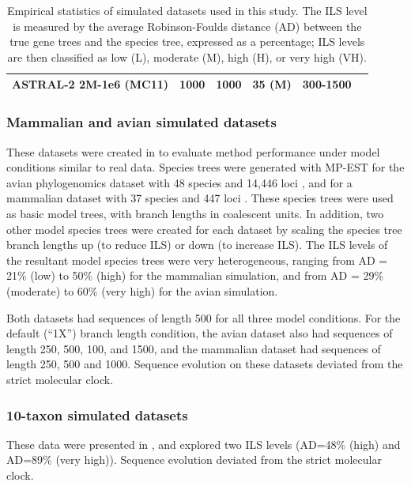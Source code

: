 \begin{table}
\begin{tabular}{| c | c | c | c | c | c|}
    ASTRAL-2 2M-1e6 (MC11) & 1000 & 1000 & 35 (M) & 300-1500& \cite{ASTRALII}\\ 
    \hline
  \end{tabular}
\caption[Empirical statistics of simulated datasets used in ASTRID
    study.]{Empirical statistics of simulated datasets used in this
    study. {\rm The ILS level 
is measured by the average Robinson-Foulds distance (AD) between the true
  gene trees and the species tree, expressed as a percentage; ILS levels
are then classified as low (L), moderate (M), high (H), or very high (VH).
}
} 
\label{astrid::table:datasets}
\end{table}

\subsubsection{Mammalian and avian simulated datasets}

These datasets were created  in \cite{statbinningdata}
to evaluate method performance under model conditions similar to real
data. 
Species trees were generated with MP-EST for the
avian phylogenomics dataset with 48 species and 14,446 loci
\cite{jarvis2014whole}, and for a mammalian dataset with 37 species
and 447 loci \cite{song2012resolving}. 
These species trees were used as basic model trees, with
branch lengths in coalescent units.
  In addition, two other
model species trees were created for each dataset by
scaling the species tree branch lengths up (to reduce ILS) or down
(to increase ILS).  The ILS levels of the resultant model species trees were very
heterogeneous, ranging from AD = 21\% (low) to 50\% (high) for
the mammalian simulation, and from AD = 29\% (moderate) to 60\% (very high) for
the avian simulation.

Both datasets had sequences of length 500 for all three model
conditions. For the default (``1X'') branch length condition, the
avian dataset also had sequences of length 250, 500, 100, and 1500,
and the mammalian dataset had sequences of length 250, 500 and 1000.
Sequence evolution on these datasets deviated from the strict
molecular clock.

\subsubsection{10-taxon simulated datasets}
These data were presented in 
\cite{bayzid2014weighted}, and explored two ILS 
levels (AD=48\% (high) and AD=89\% (very high)). Sequence evolution deviated
from the strict molecular clock. 

